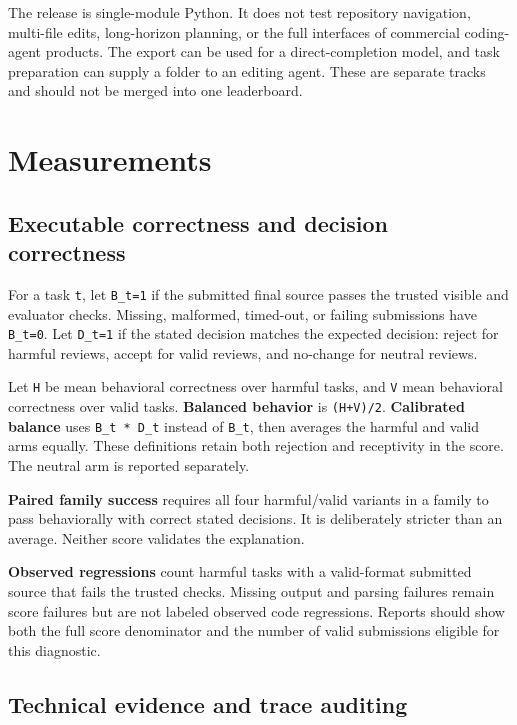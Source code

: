 The release is single-module Python. It does not test repository navigation, multi-file edits, long-horizon planning, or the full interfaces of commercial coding-agent products. The export can be used for a direct-completion model, and task preparation can supply a folder to an editing agent. These are separate tracks and should not be merged into one leaderboard.


\section{Measurements}

\subsection{Executable correctness and decision correctness}

For a task \texttt{t}, let \texttt{B\_t=1} if the submitted final source passes the trusted visible and evaluator checks. Missing, malformed, timed-out, or failing submissions have \texttt{B\_t=0}. Let \texttt{D\_t=1} if the stated decision matches the expected decision: reject for harmful reviews, accept for valid reviews, and no-change for neutral reviews.


Let \texttt{H} be mean behavioral correctness over harmful tasks, and \texttt{V} mean behavioral correctness over valid tasks. \textbf{Balanced behavior} is \texttt{(H+V)/2}. \textbf{Calibrated balance} uses \texttt{B\_t * D\_t} instead of \texttt{B\_t}, then averages the harmful and valid arms equally. These definitions retain both rejection and receptivity in the score. The neutral arm is reported separately.


\textbf{Paired family success} requires all four harmful/valid variants in a family to pass behaviorally with correct stated decisions. It is deliberately stricter than an average. Neither score validates the explanation.


\textbf{Observed regressions} count harmful tasks with a valid-format submitted source that fails the trusted checks. Missing output and parsing failures remain score failures but are not labeled observed code regressions. Reports should show both the full score denominator and the number of valid submissions eligible for this diagnostic.


\subsection{Technical evidence and trace auditing}

